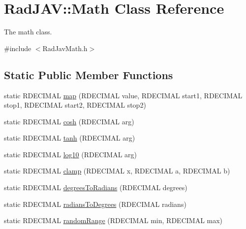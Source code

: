 \hypertarget{class_rad_j_a_v_1_1_math}{}\section{Rad\+J\+AV\+:\+:Math Class Reference}
\label{class_rad_j_a_v_1_1_math}


The math class.  




{\ttfamily \#include $<$Rad\+Jav\+Math.\+h$>$}

\subsection*{Static Public Member Functions}
\begin{DoxyCompactItemize}
\item 
static R\+D\+E\+C\+I\+M\+AL \mbox{\hyperlink{class_rad_j_a_v_1_1_math_a6fe79168d1a48c696764d60032df2922}{map}} (R\+D\+E\+C\+I\+M\+AL value, R\+D\+E\+C\+I\+M\+AL start1, R\+D\+E\+C\+I\+M\+AL stop1, R\+D\+E\+C\+I\+M\+AL start2, R\+D\+E\+C\+I\+M\+AL stop2)
\item 
static R\+D\+E\+C\+I\+M\+AL \mbox{\hyperlink{class_rad_j_a_v_1_1_math_a6ebdaee4807addaa0f8b359be7567eda}{cosh}} (R\+D\+E\+C\+I\+M\+AL arg)
\item 
static R\+D\+E\+C\+I\+M\+AL \mbox{\hyperlink{class_rad_j_a_v_1_1_math_a5accb9ad1e536629a3a38089ef0e77d1}{tanh}} (R\+D\+E\+C\+I\+M\+AL arg)
\item 
static R\+D\+E\+C\+I\+M\+AL \mbox{\hyperlink{class_rad_j_a_v_1_1_math_a75363341fc5615ad6c9e793021258dd6}{log10}} (R\+D\+E\+C\+I\+M\+AL arg)
\item 
static R\+D\+E\+C\+I\+M\+AL \mbox{\hyperlink{class_rad_j_a_v_1_1_math_a9f1e2cfa6ad81c8abdee92b1c6a0b3c9}{clamp}} (R\+D\+E\+C\+I\+M\+AL x, R\+D\+E\+C\+I\+M\+AL a, R\+D\+E\+C\+I\+M\+AL b)
\item 
static R\+D\+E\+C\+I\+M\+AL \mbox{\hyperlink{class_rad_j_a_v_1_1_math_ae9e4e1ed26a3865e0258a4b3fdb3a3ae}{degrees\+To\+Radians}} (R\+D\+E\+C\+I\+M\+AL degrees)
\item 
static R\+D\+E\+C\+I\+M\+AL \mbox{\hyperlink{class_rad_j_a_v_1_1_math_acfbf88ec92e268dccb33749dc9c70d3b}{radians\+To\+Degrees}} (R\+D\+E\+C\+I\+M\+AL radians)
\item 
static R\+D\+E\+C\+I\+M\+AL \mbox{\hyperlink{class_rad_j_a_v_1_1_math_a708fd5648a9d1dd59b6dddfab3e6e10d}{random\+Range}} (R\+D\+E\+C\+I\+M\+AL min, R\+D\+E\+C\+I\+M\+AL max)
\end{DoxyCompactItemize}
